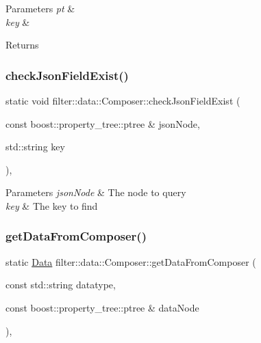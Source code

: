 \begin{DoxyParams}{Parameters}
{\em pt} & \\
\hline
{\em key} & \\
\hline
\end{DoxyParams}
\begin{DoxyReturn}{Returns}

\end{DoxyReturn}
\mbox{\label{classfilter_1_1data_1_1_composer_a559095987098ff3e3997c6c093a3bff0}} 
\subsubsection{\texorpdfstring{check\+Json\+Field\+Exist()}{checkJsonFieldExist()}}
{\footnotesize\ttfamily static void filter\+::data\+::\+Composer\+::check\+Json\+Field\+Exist (\begin{DoxyParamCaption}\item[{const boost\+::property\+\_\+tree\+::ptree \&}]{json\+Node,  }\item[{std\+::string}]{key }\end{DoxyParamCaption})\hspace{0.3cm}{\ttfamily [inline]}, {\ttfamily [static]}}


\begin{DoxyParams}{Parameters}
{\em json\+Node} & The node to query \\
\hline
{\em key} & The key to find \\
\hline
\end{DoxyParams}
\mbox{\label{classfilter_1_1data_1_1_composer_a8cd1c9f8d5f54bbc93d92d26ecb3d85a}} 
\subsubsection{\texorpdfstring{get\+Data\+From\+Composer()}{getDataFromComposer()}\hspace{0.1cm}{\footnotesize\ttfamily [1/2]}}
{\footnotesize\ttfamily static \hyperlink{classfilter_1_1data_1_1_data}{Data} filter\+::data\+::\+Composer\+::get\+Data\+From\+Composer (\begin{DoxyParamCaption}\item[{const std\+::string}]{datatype,  }\item[{const boost\+::property\+\_\+tree\+::ptree \&}]{data\+Node }\end{DoxyParamCaption})\hspace{0.3cm}{\ttfamily [inline]}, {\ttfamily [static]}}

